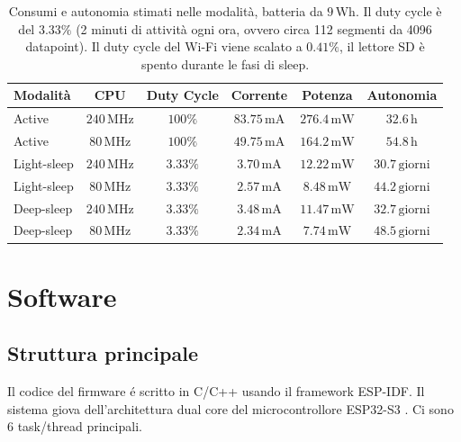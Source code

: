 \begin{table}[H]
	\centering
	\label{tab:esp32s3_duty_cycle}
	\begin{tabularx}{\textwidth}{lccccc}
		\hline
		\textbf{Modalità} & \textbf{CPU} & \textbf{Duty Cycle} & \textbf{Corrente} & \textbf{Potenza} & \textbf{Autonomia} \\
		\hline
		Active & $240\,\mathrm{MHz}$ & $100\%$ & $83.75\,\mathrm{mA}$ & $276.4\,\mathrm{mW}$ & $32.6\,\mathrm{h}$ \\
		Active & $80\,\mathrm{MHz}$ & $100\%$ & $49.75\,\mathrm{mA}$ & $164.2\,\mathrm{mW}$ & $54.8\,\mathrm{h}$ \\
		Light-sleep & $240\,\mathrm{MHz}$ & $3.33\%$ & $3.70\,\mathrm{mA}$ & $12.22\,\mathrm{mW}$ & $30.7\,\mathrm{giorni}$ \\
		Light-sleep & $80\,\mathrm{MHz}$ & $3.33\%$ & $2.57\,\mathrm{mA}$ & $8.48\,\mathrm{mW}$ & $44.2\,\mathrm{giorni}$ \\
		Deep-sleep & $240\,\mathrm{MHz}$ & $3.33\%$ & $3.48\,\mathrm{mA}$ & $11.47\,\mathrm{mW}$ & $32.7\,\mathrm{giorni}$ \\
		Deep-sleep & $80\,\mathrm{MHz}$ & $3.33\%$ & $2.34\,\mathrm{mA}$ & $7.74\,\mathrm{mW}$ & $48.5\,\mathrm{giorni}$ \\
		\hline
	\end{tabularx}
	\caption{Consumi e autonomia stimati nelle modalità, batteria da \(9\,\mathrm{Wh}\). Il duty cycle è del \(3.33\%\) (2 minuti di attività ogni ora, ovvero circa 112 segmenti da 4096 datapoint). Il duty cycle del Wi-Fi viene scalato a \(0.41\%\), il lettore SD è spento durante le fasi di sleep.}
\end{table}

\section{Software}
\subsection{Struttura principale}
Il codice del firmware é scritto in C/C++ usando il framework ESP-IDF.
Il sistema giova dell'architettura dual core del microcontrollore ESP32-S3 \cite{esp32s3_datasheet}.
Ci sono 6 task/thread principali.



